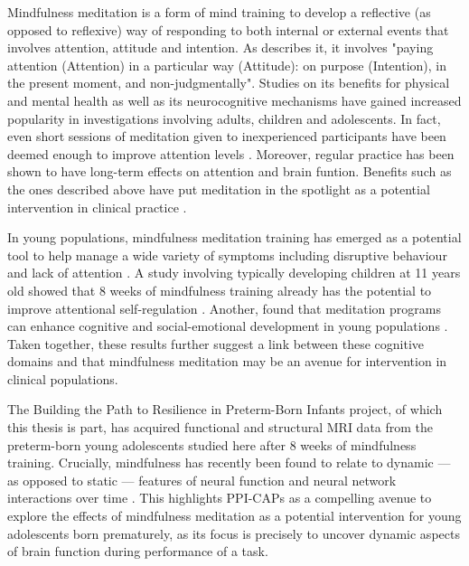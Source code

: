 Mindfulness meditation is a form of mind training to develop a reflective (as opposed to reflexive) way of responding to both internal or external events \citep{Bishop2004} that involves attention, attitude and intention. As \citep{Kabat-Zinn1994} describes it, it involves "paying attention (Attention) in a particular way (Attitude): on purpose (Intention), in the present moment, and non-judgmentally". Studies on its benefits for physical and mental health as well as its neurocognitive mechanisms have gained increased popularity in investigations involving adults, children and adolescents. In fact, even short sessions of meditation given to inexperienced participants have been deemed enough to improve attention levels \citet{Norris2018, Jankowski2020}. Moreover, regular practice has been shown to have long-term effects on attention \citep{Zanesco2018} and brain funtion. Benefits such as the ones described above have put meditation in the spotlight as a potential intervention in clinical practice \citep{Simkin2014,Zhang2018}.

In young populations, mindfulness meditation training has emerged as a potential tool to help manage a wide variety of symptoms including disruptive behaviour \citep{Perry-Parrish2016} and lack of attention \citep{Zhang2018}. A study involving typically developing children at 11 years old showed that 8 weeks of mindfulness training already has the potential to improve attentional self-regulation \citep{Felver2017}. Another, found that meditation programs can enhance cognitive and social-emotional development in young populations \citep{Schonert-Reichl2015}. Taken together, these results further suggest a link between these cognitive domains and that mindfulness meditation may be an avenue for intervention in clinical populations.


The Building the Path to Resilience in Preterm-Born Infants project, of which this thesis is part, has acquired functional and structural MRI data from the preterm-born young adolescents studied here after 8 weeks of mindfulness training. Crucially, mindfulness has recently been found to relate to dynamic --- as opposed to static --- features of neural function and neural network interactions over time \citep{Marusak2018}. This highlights PPI-CAPs as a compelling avenue to explore the effects of mindfulness meditation as a potential intervention for young adolescents born prematurely, as its focus is precisely to uncover dynamic aspects of brain function during performance of a task.  





